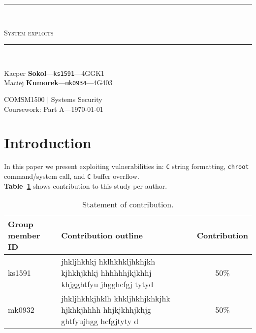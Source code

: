 \documentclass[12pt, a4paper, pdflatex]{article}
\newcommand{\HRule}{\rule{\linewidth}{0.5mm}}
\begin{document}

\begin{center}
    \begin{large}
    {\HRule \\[0.2cm]}
    \textsc{System exploits}
    {\HRule \\[0.3cm]}
    \end{large}

    \begin{minipage}{ 0.49\textwidth }
        \begin{flushleft}
            Kacper \textbf{Sokol}---\texttt{ks1591}---4GGK1\\
            Maciej \textbf{Kumorek}---\texttt{mk0934}---4G403\\
        \end{flushleft}
    \end{minipage}
    \begin{minipage}{ 0.49\textwidth }
        \begin{flushright}
            {COMSM1500 $|$ Systems Security\\
            Coursework: Part A---\today\\[0.3cm]}
        \end{flushright}
    \end{minipage}
\end{center}

\section{Introduction}
In this paper we present exploiting vulnerabilities in: \texttt{C} string formatting, \texttt{chroot} command/system call, and \texttt{C} buffer overflow.\\
\textbf{Table~\ref{tab:SoC}} shows contribution to this study per author.

\begin{center}
  \begin{table}[h]
    \begin{tabular}{ l | p{8.5cm} | c }
      Group member ID & Contribution outline & Contribution \\
      \hline
      ks1591 & jhkljhkhkj hklhkhkljhkhjkh kjhkhjkhkj hhhhhhjkjkhhj khjgghtfyu jhgghcfgj tytyd & 50\% \\
      mk0932 & jhkljhkhkjhklh  khkljhkhjkhkjhk hjkhkjhhhh hhjkjkhhjkhjg ghtfyujhgg hcfgjtyty d & 50\% \\
    \end{tabular}
    \caption{Statement of contribution.\label{tab:SoC}}
  \end{table}
\end{center}
\end{document}
